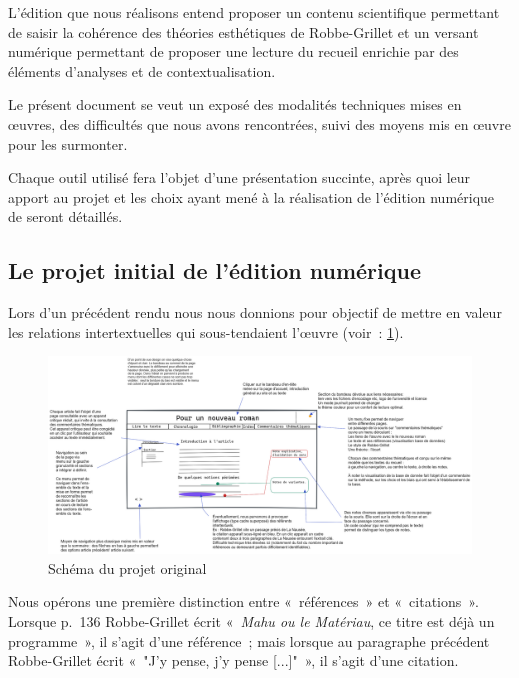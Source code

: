 \documentclass[12pt, a4paper]{article}
\begin{document}
L'édition que nous réalisons entend proposer un contenu scientifique permettant de saisir la cohérence des théories esthétiques de Robbe-Grillet et un versant numérique permettant de proposer une lecture du recueil enrichie par des éléments d'analyses et de contextualisation.




Le présent document se veut un exposé des modalités techniques mises en œuvres, des difficultés que nous avons rencontrées, suivi des moyens mis en œuvre pour les surmonter.

Chaque outil utilisé fera l'objet d'une présentation succinte, après quoi leur apport au projet et les choix ayant mené à la réalisation de l'édition numérique de \punr{} seront détaillés.



\subsection{Le projet initial de l'édition numérique}

Lors d'un précédent rendu nous nous donnions pour objectif de mettre en valeur les relations intertextuelles qui sous-tendaient l'œuvre (voir~: \ref{fig:projet}).

\begin{figure}[H]
    \centering
    \includegraphics[scale=0.3]{img/202211_mevel_punr_edition_numerique.png}
    \caption{Schéma du projet original}
    \label{fig:projet}
\end{figure}



Nous opérons une première distinction entre «~références~» et «~citations~». Lorsque p.~136 Robbe-Grillet écrit «~\textit{Mahu ou le Matériau}, ce titre est déjà un programme~», il s'agit d'une référence~; mais lorsque au paragraphe précédent Robbe-Grillet écrit «~"J'y pense, j'y pense [...]"~», il s'agit d'une citation.
\end{document}
